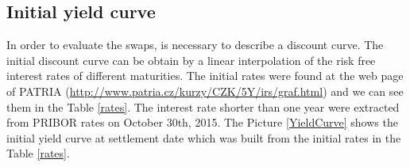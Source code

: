 \documentclass[a4paper,12pt]{report}
\theoremstyle{definition} \newtheorem{definice}[veta]{Definice}
\theoremstyle{remark}
\begin{document}
\subsection{Initial yield curve}
In order to evaluate the swaps, is necessary to describe a discount curve. The initial discount curve can be obtain by a linear interpolation of the risk free interest rates of different maturities. The initial rates were found at the web page of PATRIA (\href{URL}{http://www.patria.cz/kurzy/CZK/5Y/irs/graf.html}) and we can see them in the Table \ref{rates}.%
The interest rate shorter than one year were extracted from PRIBOR rates on October 30th, 2015. 
The Picture \ref{YieldCurve} shows the initial yield curve at settlement date which was built from the initial rates in the Table \ref{rates}.
\begin{table}
  \centering 
\caption{Počáteční úrokové míry}%
\vspace{0.5cm}
\label{rates}
\end{table}
\end{document}
